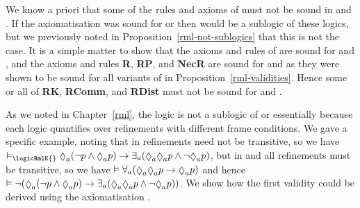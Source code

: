 We know a priori that some of the rules and axioms of \axiomRmlK{} must not be sound in \logicRmlKFF{} and \logicRmlKD{}.
If the axiomatisation \axiomRmlK{} was sound for \logicRmlKFF{} or \logicRmlKD{} then \logicRmlK{} would be a sublogic of these logics, but we previously noted in Proposition~\ref{rml-not-sublogics} that this is not the case.
It is a simple matter to show that the axioms and rules of \axiomK{} are sound for \logicRmlKFF{} and \logicRmlKD{}, and the axioms and rules {\bf R}, {\bf RP}, and {\bf NecR} are sound for \logicRmlKFF{} and \logicRmlKD{} as they were shown to be sound for all variants of \logicRml{} in Proposition~\ref{rml-validities}.
Hence some or all of {\bf RK}, {\bf RComm}, and {\bf RDist} must not be sound for \logicRmlKFF{} and \logicRmlKD{}. 

As we noted in Chapter~\ref{rml}, the logic \logicRmlK{} is not a sublogic of \logicRmlKFF{} or \logicRmlKD{} essentially because each logic quantifies over refinements with different frame conditions.
We gave a specific example, noting that in \logicRmlK{} refinements need not be transitive, so we have $\entails_\logicRmlK{} \possibleA (\lnot \atomP \land \possibleA \atomP) \implies \somerefsA (\possibleA \possibleA \atomP \land \lnot \possibleA \atomP)$, but in \logicRmlKFF{} and \logicRmlKD{} all refinements must be transitive, so we have $\entails \allrefsA (\possibleA \possibleA \atomP \implies \possibleA \atomP)$ and hence $
\entails \lnot (\possibleA (\lnot \atomP \land \possibleA \atomP) \implies \somerefsA (\possibleA \possibleA \atomP \land \lnot \possibleA \atomP))$.
We show how the first validity could be derived using the axiomatisation \axiomRmlK{}.
